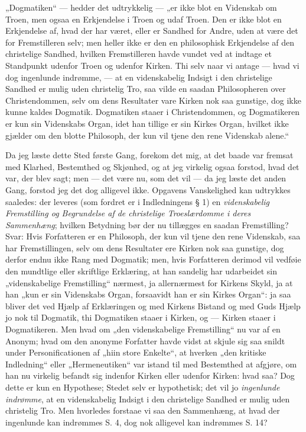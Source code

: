 „Dogmatiken“ --- hedder det udtrykkelig --- „er ikke blot en
Videnskab om Troen, men ogsaa en Erkjendelse
 i Troen og udaf Troen. Den er ikke blot en Erkjendelse af, hvad
der har været, eller er Sandhed for Andre, uden at være det for
Fremstilleren selv; men heller ikke er den en philosophisk
Erkjendelse af den christelige Sandhed, hvilken Fremstilleren
havde vundet ved at indtage et Standpunkt udenfor Troen og udenfor
Kirken. Thi selv naar vi antage --- hvad vi dog ingenlunde
indrømme, --- at en videnskabelig Indsigt i den christelige
Sandhed er mulig uden christelig Tro, saa vilde en saadan
Philosopheren over Christendommen, selv om dens Resultater vare
Kirken nok saa gunstige, dog ikke kunne kaldes Dogmatik.
Dogmatiken staaer i Christendommen, og Dogmatikeren er kun sin
Videnskabs Organ, idet han tillige er sin Kirkes Organ, hvilket
ikke gjælder om den blotte Philosoph, der kun vil tjene den rene
Videnskab alene.“

Da jeg læste dette Sted første Gang, forekom det mig, at det baade
var fremsat med Klarhed, Bestemthed og Skjønhed, og at jeg
virkelig ogsaa forstod, hvad det var, der blev sagt; men --- det
være nu, som det vil --- da jeg læste det anden Gang, forstod jeg
det dog alligevel ikke. Opgavens Vanskelighed kan udtrykkes
saaledes: der leveres (som fordret
{} er i Indledningens § 1) en \emph{videnskabelig Fremstilling og
Begrundelse af de christelige Troeslærdomme i deres Sammenhæng};
hvilken Betydning bør der nu tillægges en saadan Fremstilling?
Svar: Hvis Forfatteren er en Philosoph, der kun vil tjene den rene
Videnskab, saa har
 Fremstillingen, selv om dens Resultater ere Kirken nok saa
gunstige, dog derfor endnu ikke Rang med Dogmatik; men, hvis
Forfatteren derimod vil vedføie den mundtlige eller skriftlige
Erklæring, at han sandelig har udarbeidet sin „videnskabelige
Fremstilling“ nærmest, ja allernærmest for Kirkens Skyld, ja at
han „kun er sin Videnskabs Organ, forsaavidt han er sin Kirkes
Organ“: ja saa bliver det ved Hjælp af Erklæringen og med Kirkens
Bistand og med Guds Hjælp jo nok til Dogmatik, thi Dogmatiken
staaer i Kirken, og --- Kirken staaer i Dogmatikeren. Men hvad om
„den videnskabelige Fremstilling“ nu var af en Anonym; hvad om den
anonyme Forfatter havde vidst at skjule sig saa snildt under
Personificationen af „hiin store Enkelte“, at hverken „den
kritiske Indledning“ eller „Hermeneutiken“ var istand til med
Bestemthed at afgjøre, om han nu virkelig befandt sig indenfor
Kirken eller udenfor Kirken: hvad saa? Dog dette er kun en
Hypothese; Stedet selv er hypothetisk; det vil jo \emph{ingenlunde
indrømme}, at en videnskabelig Indsigt i den christelige Sandhed
er mulig uden christelig Tro. Men hvorledes forstaae vi saa den
Sammenhæng, at hvad der ingenlunde kan indrømmes S. 4, dog nok
alligevel kan indrømmes S. 14?

